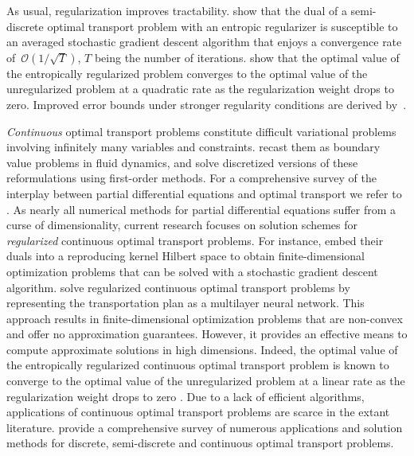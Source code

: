 \documentclass[11pt, a4paper, oneside, reqno]{article}
\begin{document}
	As usual, regularization improves tractability. \citet{genevay2016stochastic} show that the dual of a semi-discrete optimal transport problem with an entropic regularizer is susceptible to an averaged stochastic gradient descent algorithm that enjoys a convergence rate of~$\mathcal O(1/\sqrt{T})$, $T$ being the number of iterations. {\color{black} \citet{ref:altschuler2022asymptotics} show that the optimal value of the entropically regularized problem converges to the optimal value of the unregularized problem at a quadratic rate as the regularization weight drops to zero. Improved error bounds under stronger regularity conditions are derived by~\citet{ref:delalande2021nearly}.}
	

	{\em Continuous} optimal transport problems constitute difficult variational problems involving infinitely many variables and constraints. \citet{benamou2000computational} recast them as boundary value problems in fluid dynamics, %
	and \citet{papadakis2014optimal} solve discretized versions of these reformulations using first-order methods. For a comprehensive survey of the interplay between partial differential equations and optimal transport we refer to \citep{evans1997partial}. As nearly all numerical methods for partial differential equations suffer from a curse of dimensionality, current research focuses on solution schemes for {\em regularized} continuous optimal transport problems. 
	For instance, \citet{genevay2016stochastic} embed their duals into a reproducing kernel Hilbert space to obtain finite-dimensional optimization problems that can be solved with a stochastic gradient descent algorithm. \citet{seguy2017large} solve regularized continuous optimal transport problems by representing the transportation plan as a multilayer neural network. This approach results in finite-dimensional optimization problems that are non-convex and offer no approximation guarantees. However, it provides an effective means to compute approximate solutions in high dimensions. {\color{black} Indeed, the optimal value of the entropically regularized continuous optimal transport problem is known to converge to the optimal value of the unregularized problem at a linear rate as the regularization weight drops to zero \citep{ref:chizat2020faster, ref:conforti2021formula, ref:erbar2015large,ref:pal2019difference}.} Due to a lack of efficient algorithms, applications of continuous optimal transport problems are scarce in the extant literature. \citet{peyre2019computational} provide a comprehensive survey of numerous applications and solution methods for discrete, semi-discrete and continuous optimal transport problems.
	
\end{document}
